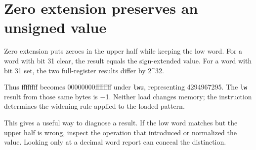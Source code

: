 \section{Zero extension preserves an unsigned
  value}\label{004-bit-inspector-p04-zero-extension-preserves-an-unsigned-value}

Zero extension puts zeroes in the upper half while keeping the low word.
For a word with bit 31 clear, the result equals the sign-extended value.
For a word with bit 31 set, the two full-register results differ by
2\^{}32.

Thus ffffffff becomes 00000000ffffffff under \texttt{lwu}, representing
4294967295. The \texttt{lw} result from those same bytes is \ensuremath{-}1. Neither
load changes memory; the instruction determines the widening rule
applied to the loaded pattern.

This gives a useful way to diagnose a result. If the low word matches
but the upper half is wrong, inspect the operation that introduced or
normalized the value. Looking only at a decimal word report can conceal
the distinction.
